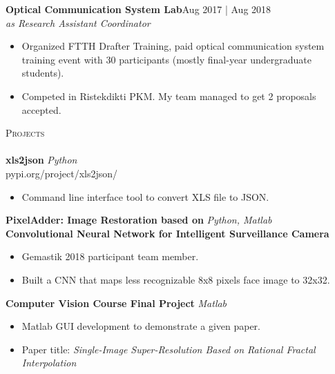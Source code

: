 \documentclass[a4paper]{article}
\newcommand{\lineunder} {
    \vspace*{-8pt} \\
    \hspace*{-18pt} \hrulefill \\
}
\newcommand{\header} [1] {
    {\hspace*{-18pt}\vspace*{6pt} \textsc{#1}}
    \vspace*{-6pt} \lineunder
}
\begin{document}
\textbf{Optical Communication System Lab}\hfill Aug 2017 | Aug 2018\\
\textit{as Research Assistant Coordinator} \\
\vspace{-1mm}
\begin{itemize} \itemsep 1pt
  \item Organized FTTH Drafter Training, paid optical communication system training event with 30 participants (mostly final-year undergraduate students).
  \item Competed in Ristekdikti PKM. My team managed to get 2 proposals accepted.
  
\end{itemize}


\header{Projects}
{\textbf{xls2json}} \hfill {\sl Python}\\pypi.org/project/xls2json/\\

\vspace{-1mm}
\begin{itemize} \itemsep 1pt
	\item Command line interface tool to convert XLS file to JSON.  
\end{itemize}

\vspace*{2mm}

{\textbf{PixelAdder: Image Restoration based on
}} \hfill {\sl Python, Matlab}\\
{\textbf{Convolutional Neural Network for Intelligent Surveillance Camera}}


\vspace{-1mm}
\begin{itemize} \itemsep 1pt
	\item Gemastik 2018 participant team member.
  \item Built a CNN that maps less recognizable 8x8 pixels face image to 32x32.
  
  
\end{itemize}


\vspace*{2mm}

{\textbf{Computer Vision Course Final Project}} \hfill {\sl Matlab}\\

\vspace{-1mm}
\begin{itemize} \itemsep 1pt
	\item Matlab GUI development to demonstrate a given paper.
    \item Paper title: \textit{Single-Image Super-Resolution Based on Rational Fractal Interpolation}
  
\end{itemize}
\end{document}
